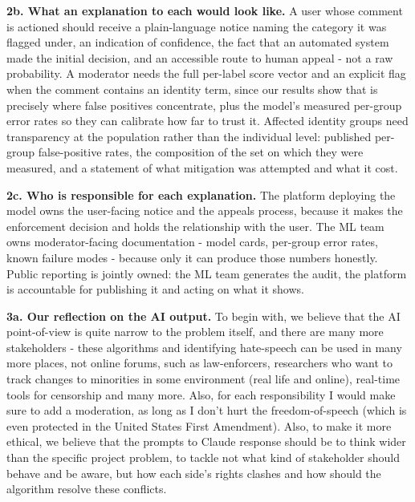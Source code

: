 \documentclass[10pt,a4paper]{article}
\begin{document}
\textbf{2b. What an explanation to each would look like.} A user whose comment is
actioned should receive a plain-language notice naming the category it was flagged
under, an indication of confidence, the fact that an automated system made the
initial decision, and an accessible route to human appeal - not a raw probability.
A moderator needs the full per-label score vector and an explicit flag when the
comment contains an identity term, since our results show that is precisely where
false positives concentrate, plus the model's measured per-group error rates so they
can calibrate how far to trust it. Affected identity groups need transparency at the
population rather than the individual level: published per-group false-positive
rates, the composition of the set on which they were measured, and a statement of
what mitigation was attempted and what it cost.

\textbf{2c. Who is responsible for each explanation.} The platform deploying the model owns the
user-facing notice and the appeals process, because it makes the enforcement decision
and holds the relationship with the user. The ML team owns moderator-facing
documentation - model cards, per-group error rates, known failure modes - because
only it can produce those numbers honestly. Public reporting is jointly owned: the ML
team generates the audit, the platform is accountable for publishing it and acting on
what it shows.

\textbf{3a. Our reflection on the AI output.}
\newline To begin with, we believe that the AI point-of-view is quite narrow to the problem itself, and there are many more stakeholders - these algorithms and identifying hate-speech can be used in many more places, not online forums, such as law-enforcers, researchers who want to track changes to minorities in some environment (real life and online), real-time tools for censorship and many more. Also, for each responsibility I would make sure to add a moderation, as long as I don't hurt the freedom-of-speech (which is even protected in the United States First Amendment). Also, to make it more ethical, we believe that the prompts to Claude response should be to think wider than the specific project problem, to tackle not what kind of stakeholder should behave and be aware, but how each side's rights clashes and how should the algorithm resolve these conflicts.
\end{document}
